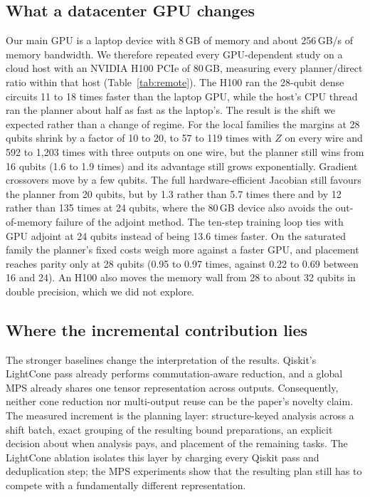\subsection{What a datacenter GPU changes}
\begin{table}[!t]
\caption{Fastest Direct Method's Time over the Planner's, Each Measured Within One Host: the Laptop RTX 4060 (Lap.) and a Cloud H100 PCIe (Rem.), by Number of Qubits.}
\label{tab:remote}
\centering
\footnotesize
\resizebox{\columnwidth}{!}{}
\end{table}
Our main GPU is a laptop device with 8\,GB of memory and about 256\,GB/s of memory bandwidth. We therefore repeated every GPU-dependent study on a cloud host with an NVIDIA H100 PCIe of 80\,GB, measuring every planner/direct ratio within that host (Table~\ref{tab:remote}). The H100 ran the 28-qubit dense circuits 11 to 18 times faster than the laptop GPU, while the host's CPU thread ran the planner about half as fast as the laptop's. The result is the shift we expected rather than a change of regime. For the local families the margins at 28 qubits shrink by a factor of 10 to 20, to 57 to 119 times with $Z$ on every wire and 592 to 1,203 times with three outputs on one wire, but the planner still wins from 16 qubits (1.6 to 1.9 times) and its advantage still grows exponentially. Gradient crossovers move by a few qubits. The full hardware-efficient Jacobian still favours the planner from 20 qubits, but by 1.3 rather than 5.7 times there and by 12 rather than 135 times at 24 qubits, where the 80\,GB device also avoids the out-of-memory failure of the adjoint method. The ten-step training loop ties with GPU adjoint at 24 qubits instead of being 13.6 times faster. On the saturated family the planner's fixed costs weigh more against a faster GPU, and placement reaches parity only at 28 qubits (0.95 to 0.97 times, against 0.22 to 0.69 between 16 and 24). An H100 also moves the memory wall from 28 to about 32 qubits in double precision, which we did not explore.

\subsection{Where the incremental contribution lies}
The stronger baselines change the interpretation of the results. Qiskit's LightCone pass already performs commutation-aware reduction, and a global MPS already shares one tensor representation across outputs. Consequently, neither cone reduction nor multi-output reuse can be the paper's novelty claim. The measured increment is the planning layer: structure-keyed analysis across a shift batch, exact grouping of the resulting bound preparations, an explicit decision about when analysis pays, and placement of the remaining tasks. The LightCone ablation isolates this layer by charging every Qiskit pass and deduplication step; the MPS experiments show that the resulting plan still has to compete with a fundamentally different representation.

